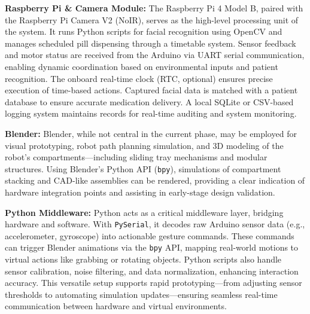 \vspace{0.5em}

\textbf{Raspberry Pi \& Camera Module:} The Raspberry Pi 4 Model B, paired with the Raspberry Pi Camera V2 (NoIR), serves as the high-level processing unit of the system. It runs Python scripts for facial recognition using OpenCV and manages scheduled pill dispensing through a timetable system. Sensor feedback and motor status are received from the Arduino via UART serial communication, enabling dynamic coordination based on environmental inputs and patient recognition. The onboard real-time clock (RTC, optional) ensures precise execution of time-based actions. Captured facial data is matched with a patient database to ensure accurate medication delivery. A local SQLite or CSV-based logging system maintains records for real-time auditing and system monitoring.

\vspace{0.5em}

\textbf{Blender:} Blender, while not central in the current phase, may be employed for visual prototyping, robot path planning simulation, and 3D modeling of the robot’s compartments—including sliding tray mechanisms and modular structures. Using Blender’s Python API (\texttt{bpy}), simulations of compartment stacking and CAD-like assemblies can be rendered, providing a clear indication of hardware integration points and assisting in early-stage design validation.

\vspace{0.5em}

\textbf{Python Middleware:} Python acts as a critical middleware layer, bridging hardware and software. With \texttt{PySerial}, it decodes raw Arduino sensor data (e.g., accelerometer, gyroscope) into actionable gesture commands. These commands can trigger Blender animations via the \texttt{bpy} API, mapping real-world motions to virtual actions like grabbing or rotating objects. Python scripts also handle sensor calibration, noise filtering, and data normalization, enhancing interaction accuracy. This versatile setup supports rapid prototyping—from adjusting sensor thresholds to automating simulation updates—ensuring seamless real-time communication between hardware and virtual environments.



